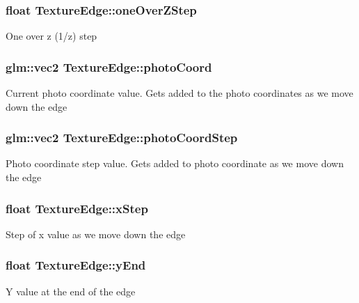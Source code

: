 \subsubsection[{one\+Over\+Z\+Step}]{\setlength{\rightskip}{0pt plus 5cm}float Texture\+Edge\+::one\+Over\+Z\+Step}\label{class_texture_edge_a074ed9078d97be9319aa786ffdcf5a2e}
One over z (1/z) step \hypertarget{class_texture_edge_abb286c00988b8204557806352f3a08fb}{}
\subsubsection[{photo\+Coord}]{\setlength{\rightskip}{0pt plus 5cm}glm\+::vec2 Texture\+Edge\+::photo\+Coord}\label{class_texture_edge_abb286c00988b8204557806352f3a08fb}
Current photo coordinate value. Gets added to the photo coordinates as we move down the edge \hypertarget{class_texture_edge_abe3b2ba9ef56a213949cfd899b0bcd86}{}
\subsubsection[{photo\+Coord\+Step}]{\setlength{\rightskip}{0pt plus 5cm}glm\+::vec2 Texture\+Edge\+::photo\+Coord\+Step}\label{class_texture_edge_abe3b2ba9ef56a213949cfd899b0bcd86}
Photo coordinate step value. Gets added to photo coordinate as we move down the edge \hypertarget{class_texture_edge_a25cef82338114b36eb787cf7388f51c2}{}
\subsubsection[{x\+Step}]{\setlength{\rightskip}{0pt plus 5cm}float Texture\+Edge\+::x\+Step}\label{class_texture_edge_a25cef82338114b36eb787cf7388f51c2}
Step of x value as we move down the edge \hypertarget{class_texture_edge_a2974871a249726ee903849f14ded2bf5}{}
\subsubsection[{y\+End}]{\setlength{\rightskip}{0pt plus 5cm}float Texture\+Edge\+::y\+End}\label{class_texture_edge_a2974871a249726ee903849f14ded2bf5}
Y value at the end of the edge \hypertarget{class_texture_edge_aedbd23f82d3d7bcefa909a817ecd1352}{}
